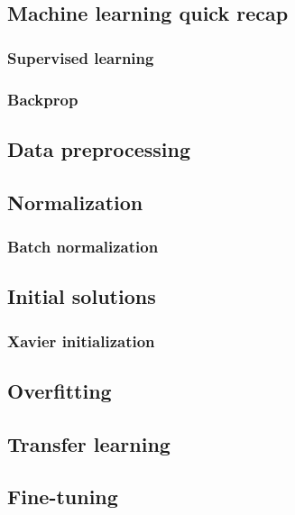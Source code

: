 \subsection{Machine learning quick recap}
\subsubsection{Supervised learning}


\subsubsection{Backprop}

\subsection{Data preprocessing}

\subsection{Normalization}

\subsubsection{Batch normalization}

\subsection{Initial solutions}

\subsubsection{Xavier initialization}

\subsection{Overfitting}


\subsection{Transfer learning}

\subsection{Fine-tuning}


